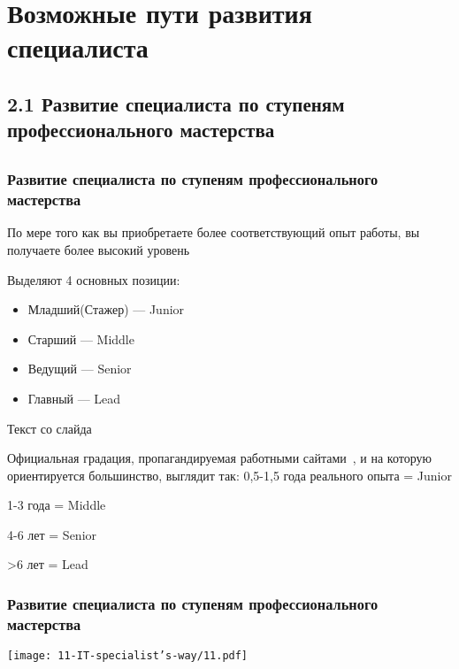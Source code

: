 \documentclass{../industrial-development}
\begin{document}

\section{Возможные пути развития специалиста }

\subsection{2.1 Развитие  специалиста по ступеням профессионального мастерства }


\subsection{}

\begin{frame} \frametitle{Развитие  специалиста по ступеням профессионального мастерства}
  \begin{block}{}
  По мере того как вы приобретаете более соответствующий опыт работы, вы получаете более высокий уровень
 \end{block}
\bigskip
Выделяют 4 основных позиции:
  
  \begin{itemize}
  \item Младший(Стажер) --- Junior
  \item Старший --- Middle
  \item Ведущий --- Senior
 \item Главный --- Lead
  \end{itemize}
\end{frame}

\lecturenotes

Текст со слайда~\cite{JMSL}

Официальная градация, пропагандируемая работными сайтами~\cite{hh}, и на которую ориентируется большинство, выглядит так:
	0,5-1,5 года реального опыта = Junior

	1-3 года = Middle 

	4-6 лет = Senior

	>6 лет = Lead


\begin{frame} \frametitle{Развитие  специалиста по ступеням профессионального мастерства}
 \centerline{\texttt{[image: 11-IT-specialist's-way/11.pdf]}}

\end{frame}
\end{document}

